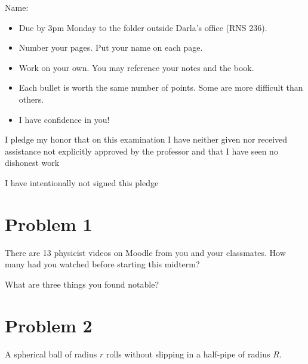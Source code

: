 \documentclass{article}
\begin{document}
Name: \makebox[2in]{\hrulefill}

\vspace{0.5in}

\begin{itemize}
    \item Due by 3pm Monday to the folder outside Darla's office (RNS 236).
    \item Number your pages. Put your name on each page.
    \item Work on your own. You may reference your notes and the book. 
    \item Each bullet is worth the same number of points. Some are more difficult than others.
    \item I have confidence in you!
\end{itemize}

\vfill

I pledge my honor that on this examination I have neither given nor received assistance not explicitly approved by the professor and that I have seen no dishonest work \makebox[2in]{\hrulefill}

\vspace{0.5in}

I have intentionally not signed this pledge \makebox[2in]{\hrulefill}

\newpage

\section*{Problem 1}

There are 13 physicist videos on Moodle from you and your classmates. How many had you watched before starting this midterm?

What are three things you found notable?

\newpage

\section*{Problem 2}

A spherical ball of radius $r$ rolls without slipping in a half-pipe of radius $R$.
\end{document}
